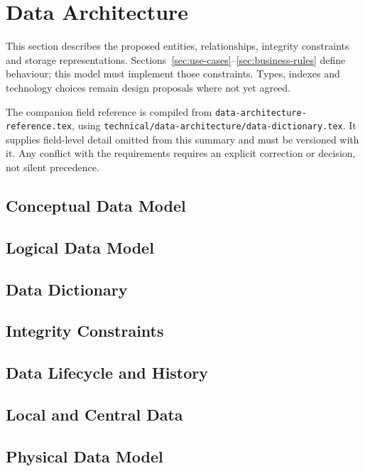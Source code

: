 \section{Data Architecture}
\label{sec:data-architecture}
This section describes the proposed entities, relationships, integrity constraints
and storage representations. Sections~\ref{sec:use-cases}--\ref{sec:business-rules}
define behaviour; this model must implement those constraints. Types, indexes and
technology choices remain design proposals where not yet agreed.

The companion field reference is compiled from
\nolinkurl{data-architecture-reference.tex}, using
\nolinkurl{technical/data-architecture/data-dictionary.tex}. It supplies field-level
detail omitted from this summary and must be versioned with it. Any conflict with
the requirements requires an explicit correction or decision, not silent precedence.

\subsection{Conceptual Data Model}
\label{sec:data-conceptual}








\FloatBarrier
{}
\subsection{Logical Data Model}
\label{sec:data-logical}

\subsection{Data Dictionary}
\label{sec:data-dictionary}

\subsection{Integrity Constraints}
\label{sec:data-integrity}

\subsection{Data Lifecycle and History}
\label{sec:data-lifecycle}

\subsection{Local and Central Data}
\label{sec:data-local-central}

\subsection{Physical Data Model}
\label{sec:data-physical}

